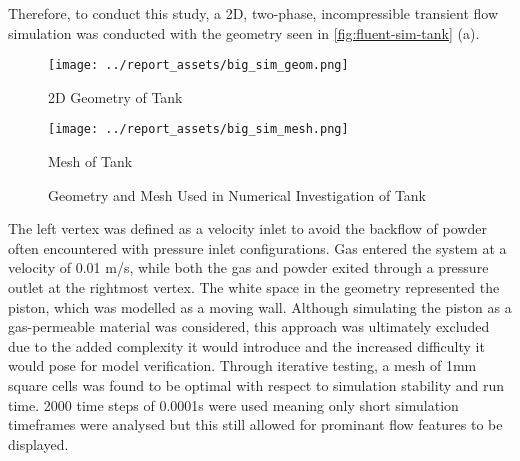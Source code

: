 Therefore, to conduct this study, a 2D, two-phase, incompressible transient flow simulation was conducted with the geometry seen in \autoref{fig:fluent-sim-tank} (a).
\begin{figure}[htbp]
    \centering

    \begin{minipage}{0.45\textwidth}
        \centering
        \texttt{[image: ../report\_assets/big\_sim\_geom.png]}
        \caption{2D Geometry of Tank}
    \end{minipage}
    \hfill
    \begin{minipage}{0.45\textwidth}
        \centering
        \texttt{[image: ../report\_assets/big\_sim\_mesh.png]}
        \caption{Mesh of Tank}\label{fig:mesh-tank}
    \end{minipage}
    \caption{Geometry and Mesh Used in Numerical Investigation of Tank}\label{fig:fluent-sim-tank}
\end{figure}
The left vertex was defined as a velocity inlet to avoid the backflow of powder often encountered with pressure inlet configurations. Gas entered the system at a velocity of 0.01 m/s, while both the gas and powder exited through a pressure outlet at the rightmost vertex. The white space in the geometry represented the piston, which was modelled as a moving wall. Although simulating the piston as a gas-permeable material was considered, this approach was ultimately excluded due to the added complexity it would introduce and the increased difficulty it would pose for model verification. Through iterative testing, a mesh of 1mm square cells was found to be optimal with respect to simulation stability and run time. 2000 time steps of 0.0001s were used meaning only short simulation timeframes were analysed but this still allowed for prominant flow features to be displayed.

